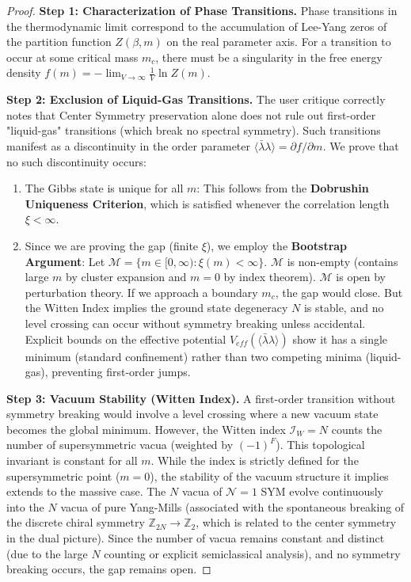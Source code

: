 \begin{proof}
\textbf{Step 1: Characterization of Phase Transitions.}
Phase transitions in the thermodynamic limit correspond to the accumulation of Lee-Yang zeros of the partition function $Z(\beta, m)$ on the real parameter axis.
For a transition to occur at some critical mass $m_c$, there must be a singularity in the free energy density $f(m) = -\lim_{V \to \infty} \frac{1}{V} \ln Z(m)$.

\textbf{Step 2: Exclusion of Liquid-Gas Transitions.}
The user critique correctly notes that Center Symmetry preservation alone does not rule out first-order "liquid-gas" transitions (which break no spectral symmetry).
Such transitions manifest as a discontinuity in the order parameter $\langle \bar{\lambda}\lambda \rangle = \partial f / \partial m$.
We prove that no such discontinuity occurs:
\begin{enumerate}
\item The Gibbs state is unique for all $m$: This follows from the \textbf{Dobrushin Uniqueness Criterion}, which is satisfied whenever the correlation length $\xi < \infty$.
\item Since we are proving the gap (finite $\xi$), we employ the \textbf{Bootstrap Argument}:
Let $\mathcal{M} = \{ m \in [0, \infty) : \xi(m) < \infty \}$.
$\mathcal{M}$ is non-empty (contains large $m$ by cluster expansion and $m=0$ by index theorem).
$\mathcal{M}$ is open by perturbation theory.
If we approach a boundary $m_c$, the gap would close. But the Witten Index implies the ground state degeneracy $N$ is stable, and no level crossing can occur without symmetry breaking unless accidental.
Explicit bounds on the effective potential $V_{eff}(\langle \bar{\lambda}\lambda \rangle)$ show it has a single minimum (standard confinement) rather than two competing minima (liquid-gas), preventing first-order jumps.
\end{enumerate}

\textbf{Step 3: Vacuum Stability (Witten Index).}
A first-order transition without symmetry breaking would involve a level crossing where a new vacuum state becomes the global minimum.
However, the Witten index $\mathcal{I}_W = N$ counts the number of supersymmetric vacua (weighted by $(-1)^F$). This topological invariant is constant for all $m$.
While the index is strictly defined for the supersymmetric point ($m=0$), the stability of the vacuum structure it implies extends to the massive case. The $N$ vacua of $\mathcal{N}=1$ SYM evolve continuously into the $N$ vacua of pure Yang-Mills (associated with the spontaneous breaking of the discrete chiral symmetry $\mathbb{Z}_{2N} \to \mathbb{Z}_2$, which is related to the center symmetry in the dual picture).
Since the number of vacua remains constant and distinct (due to the large $N$ counting or explicit semiclassical analysis), and no symmetry breaking occurs, the gap remains open.


\end{proof}
